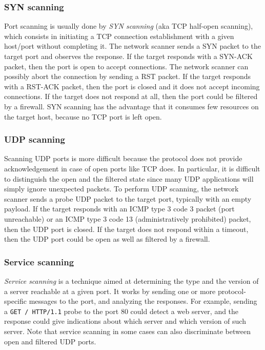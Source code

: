 \documentclass[a4paper,12pt]{article}
\begin{document}
\subsubsection{SYN scanning}
Port scanning is usually done by \textit{SYN scanning} (aka TCP half-open scanning), which consists in initiating a TCP connection establishment with a given host/port without completing it. The network scanner sends a SYN packet to the target port and observes the response. If the target responds with a SYN-ACK packet, then the port is open to accept connections. The network scanner can possibly abort the connection by sending a RST packet. If the target responds with a RST-ACK packet, then the port is closed and it does not accept incoming connections. If the target does not respond at all, then the port could be filtered by a firewall. SYN scanning has the advantage that it consumes few resources on the target host, because no TCP port is left open.

\subsubsection{UDP scanning}
Scanning UDP ports is more difficult because the protocol does not provide acknowledgement in case of open ports like TCP does. In particular, it is difficult to distinguish the open and the filtered state since many UDP applications will simply ignore unexpected packets. To perform UDP scanning, the network scanner sends a probe UDP packet to the target port, typically with an empty payload. If the target responds with an ICMP type 3 code 3 packet (port unreachable) or an ICMP type 3 code 13 (administratively prohibited) packet, then the UDP port is closed. If the target does not respond within a timeout, then the UDP port could be open as well as filtered by a firewall.

\subsubsection{Service scanning}
\textit{Service scanning} is a technique aimed at determining the type and the version of a server reachable at a given port. It works by sending one or more protocol-specific messages to the port, and analyzing the responses. For example, sending a \texttt{GET / HTTP/1.1} probe to the port 80 could detect a web server, and the response could give indications about which server and which version of such server. Note that service scanning in some cases can also discriminate between open and filtered UDP ports.
\end{document}
